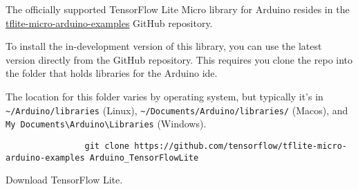 \begin{frame}[fragile]
    \par The officially supported TensorFlow Lite Micro library for Arduino\textregistered{} resides in the \href{https://github.com/tensorflow/tflite-micro-arduino-examples}{tflite-micro-arduino-examples} GitHub repository.
    \par To install the in-development version of this library, you can use the latest version directly from the GitHub repository.
    This requires you clone the repo into the folder that holds libraries for the Arduino\textregistered{} \acs{ide}.
    \par The location for this folder varies by operating system, but typically it's in \texttt{\textasciitilde{}/Arduino/libraries} (Linux), \texttt{\textasciitilde{}/Documents/Arduino/libraries/} (Mac\acs{os}), and \texttt{My Documents\textbackslash{}Arduino\textbackslash{}Libraries} (Windows).
    \begin{listing}[H]
        \begin{mdframed}
            \begin{verbatim}
                git clone https://github.com/tensorflow/tflite-micro-arduino-examples Arduino_TensorFlowLite
            \end{verbatim}
        \end{mdframed}
        \caption{Download TensorFlow Lite.}
        \label{lst:tflite:installation}
    \end{listing}
\end{frame}